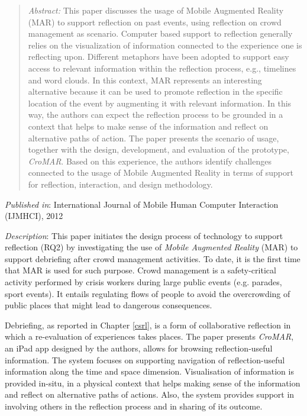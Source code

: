 \begin{quote}
	\emph{Abstract:} This paper discusses the usage of Mobile Augmented Reality (MAR) to support reflection on past events, using reflection on crowd management as scenario. Computer based support to reflection generally relies on the visualization of information connected to the experience one is reflecting upon. Different metaphors have been adopted to support easy access to relevant information within the reflection process, e.g., timelines and word clouds. In this context, MAR represents an interesting alternative because it can be used to promote reflection in the specific location of the event by augmenting it with relevant information. In this way, the authors can expect the reflection process to be grounded in a context that helps to make sense of the information and reflect on alternative paths of action. The paper presents the scenario of usage, together with the design, development, and evaluation of the prototype, \emph{CroMAR}. Based on this experience, the authors identify challenges connected to the usage of Mobile Augmented Reality in terms of support for reflection, interaction, and design methodology. 
\end{quote}

\emph{Published in}: International Journal of Mobile Human Computer Interaction (IJMHCI), 2012

\emph{Description}: This paper initiates the design process of technology to support reflection (RQ2) by investigating the use of \emph{Mobile Augmented Reality} (MAR) to support debriefing after crowd management activities. To date, it is the first time that MAR is used for such purpose. Crowd management is a safety-critical activity performed by crisis workers during large public events (e.g. parades, sport events). It entails regulating flows of people to avoid the overcrowding of public places that might lead to dangerous consequences. 

Debriefing, as reported in Chapter \ref{csrl}, is a form of collaborative reflection in which a re-evaluation of experiences takes places. The paper presents \emph{CroMAR}, an iPad app designed by the authors, allows for browsing reflection-useful information. The system focuses on supporting navigation of reflection-useful information along the time and space dimension. Visualisation of information is provided in-situ, in a physical context that helps making sense of the information and reflect on alternative paths of actions. Also, the system provides support in involving others in the reflection process and in sharing of its outcome.

